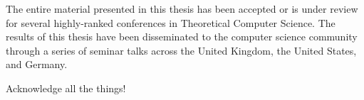 \begin{impactstatement}
The entire material presented in this thesis has been accepted or is under review for several highly-ranked conferences in Theoretical Computer Science. The results of this thesis have been disseminated to the computer science community through a series of seminar talks across the United Kingdom, the United States, and Germany. 
\end{impactstatement}

\begin{acknowledgements}
Acknowledge all the things!
\end{acknowledgements}

\setcounter{tocdepth}{2} 

\tableofcontents
\listoffigures
\listoftables

